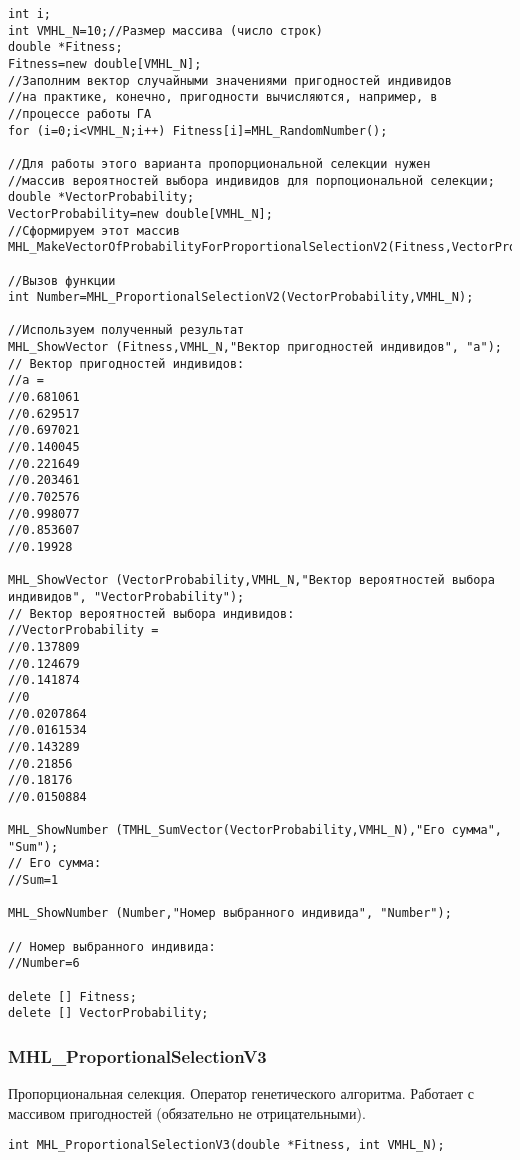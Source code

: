\documentclass[a4paper,12pt]{article}
\begin{document}
\begin{lstlisting}[label=code_use_MHL_ProportionalSelectionV2,caption=Пример использования]
int i;
int VMHL_N=10;//Размер массива (число строк)
double *Fitness;
Fitness=new double[VMHL_N];
//Заполним вектор случайными значениями пригодностей индивидов
//на практике, конечно, пригодности вычисляются, например, в
//процессе работы ГА
for (i=0;i<VMHL_N;i++) Fitness[i]=MHL_RandomNumber();

//Для работы этого варианта пропорциональной селекции нужен
//массив вероятностей выбора индивидов для порпоциональной селекции;
double *VectorProbability;
VectorProbability=new double[VMHL_N];
//Сформируем этот массив
MHL_MakeVectorOfProbabilityForProportionalSelectionV2(Fitness,VectorProbability,VMHL_N);

//Вызов функции
int Number=MHL_ProportionalSelectionV2(VectorProbability,VMHL_N);

//Используем полученный результат
MHL_ShowVector (Fitness,VMHL_N,"Вектор пригодностей индивидов", "a");
// Вектор пригодностей индивидов:
//a =	
//0.681061
//0.629517
//0.697021
//0.140045
//0.221649
//0.203461
//0.702576
//0.998077
//0.853607
//0.19928

MHL_ShowVector (VectorProbability,VMHL_N,"Вектор вероятностей выбора индивидов", "VectorProbability");
// Вектор вероятностей выбора индивидов:
//VectorProbability =	
//0.137809
//0.124679
//0.141874
//0
//0.0207864
//0.0161534
//0.143289
//0.21856
//0.18176
//0.0150884

MHL_ShowNumber (TMHL_SumVector(VectorProbability,VMHL_N),"Его сумма", "Sum");
// Его сумма:
//Sum=1
        
MHL_ShowNumber (Number,"Номер выбранного индивида", "Number");

// Номер выбранного индивида:
//Number=6

delete [] Fitness;
delete [] VectorProbability;
\end{lstlisting}

\subsubsection{MHL\_ProportionalSelectionV3}\label{MHL_ProportionalSelectionV3}

Пропорциональная селекция. Оператор генетического алгоритма. Работает с массивом пригодностей (обязательно не отрицательными).


\begin{lstlisting}[label=code_syntax_MHL_ProportionalSelectionV3,caption=Синтаксис]
int MHL_ProportionalSelectionV3(double *Fitness, int VMHL_N);
\end{lstlisting}
\end{document}
